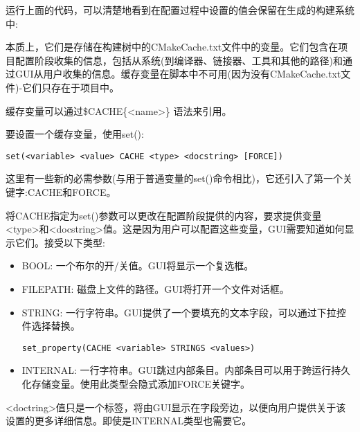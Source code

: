 运行上面的代码，可以清楚地看到在配置过程中设置的值会保留在生成的构建系统中:



本质上，它们是存储在构建树中的CMakeCache.txt文件中的变量。它们包含在项目配置阶段收集的信息，包括从系统(到编译器、链接器、工具和其他的路径)和通过GUI从用户收集的信息。缓存变量在脚本中不可用(因为没有CMakeCache.txt文件)-它们只存在于项目中。

缓存变量可以通过\$CACHE\{<name>\} 语法来引用。

要设置一个缓存变量，使用set():

\begin{lstlisting}[style=styleCMake]
set(<variable> <value> CACHE <type> <docstring> [FORCE]) 
\end{lstlisting}

这里有一些新的必需参数(与用于普通变量的set()命令相比)，它还引入了第一个关键字:CACHE和FORCE。

将CACHE指定为set()参数可以更改在配置阶段提供的内容，要求提供变量<type>和<docstring>值。这是因为用户可以配置这些变量，GUI需要知道如何显示它们。接受以下类型:

\begin{itemize}
\item 
BOOL: 一个布尔的开/关值。GUI将显示一个复选框。

\item 
FILEPATH: 磁盘上文件的路径。GUI将打开一个文件对话框。

\item 
STRING: 一行字符串。GUI提供了一个要填充的文本字段，可以通过下拉控件选择替换。

\begin{lstlisting}[style=styleCMake]
set_property(CACHE <variable> STRINGS <values>)
\end{lstlisting}

\item 
INTERNAL: 一行字符串。GUI跳过内部条目。内部条目可以用于跨运行持久化存储变量。使用此类型会隐式添加FORCE关键字。
\end{itemize}

<doctring>值只是一个标签，将由GUI显示在字段旁边，以便向用户提供关于该设置的更多详细信息。即使是INTERNAL类型也需要它。

